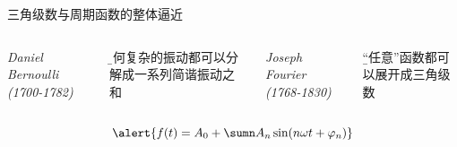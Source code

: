 \begin{frame}{三角级数与周期函数的整体逼近}
	\linespread{1.2}
	\begin{columns}
			\begin{center}
				
				{\it\small Daniel Bernoulli (1700-1782)}
			\end{center}
			\vspace{-1ex}
			{\b 任何复杂的振动都可以分解成一系列简谐振动之和} 
			\begin{center}
				
				{\it\small Joseph Fourier (1768-1830)} 
			\end{center}
			\vspace{-1ex}
			{\b “任意”函数都可以展开成三角级数}\pause 
	\end{columns}
	$$\alert{f(t)=A_0+\sumn A_n\sin(n\omega t+\varphi_n)}$$
\end{frame}

% 				
% 				
% 				

